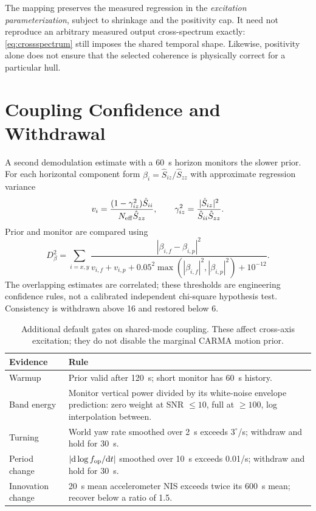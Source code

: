 \documentclass[conference]{IEEEtran}
\newcommand{\dd}{\mathrm d}
\begin{document}
The mapping preserves the measured regression in the \emph{excitation
parameterization}, subject to shrinkage and the positivity cap. It need
not reproduce an arbitrary measured output cross-spectrum exactly:
\cref{eq:crossspectrum} still imposes the shared temporal shape.
Likewise, positivity alone does not ensure that the selected coherence is
physically correct for a particular hull.

\section{Coupling Confidence and Withdrawal}
\label{sec:confidence}
A second demodulation estimate with a 60~s horizon monitors the slower
prior. For each horizontal component form
$\beta_i=\hat S_{iz}/\hat S_{zz}$ with approximate regression variance
\begin{equation}
 v_i=\frac{(1-\gamma_{iz}^2)\hat S_{ii}}{N_{\rm eff}\hat S_{zz}},\qquad
 \gamma_{iz}^2=\frac{|\hat S_{iz}|^2}{\hat S_{ii}\hat S_{zz}}.
 \label{eq:regvar}
\end{equation}
Prior and monitor are compared using
\begin{equation}
 D_\beta^2=\sum_{i=x,y}
 \frac{|\beta_{i,f}-\beta_{i,p}|^2}
 {v_{i,f}+v_{i,p}+0.05^2\max(|\beta_{i,f}|^2,|\beta_{i,p}|^2)+10^{-12}}.
 \label{eq:mismatch}
\end{equation}
The overlapping estimates are correlated; these thresholds are engineering
confidence rules, not a calibrated independent chi-square hypothesis test.
Consistency is withdrawn above 16 and restored below 6.

\begin{table}[!t]
\caption{Additional default gates on shared-mode coupling. These affect
cross-axis excitation; they do not disable the marginal CARMA motion prior.}
\label{tab:gates}\centering\footnotesize
\begin{tabular}{@{}p{}p{}@{}}\toprule
Evidence & Rule\\\midrule
Warmup & Prior valid after 120~s; short monitor has 60~s history.\\
Band energy & Monitor vertical power divided by its white-noise envelope prediction: zero weight at SNR $\le10$, full at $\ge100$, log interpolation between.\\
Turning & World yaw rate smoothed over 2~s exceeds $3^\circ$/s; withdraw and hold for 30~s.\\
Period change & $|\dd\log f_{\rm op}/\dd t|$ smoothed over 10~s exceeds 0.01/s; withdraw and hold for 30~s.\\
Innovation change & 20~s mean accelerometer NIS exceeds twice its 600~s mean; recover below a ratio of 1.5.\\\bottomrule
\end{tabular}
\end{table}
\end{document}
